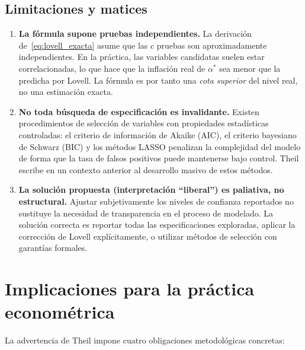 \documentclass[12pt, letterpaper]{article}
\begin{document}
\subsection{Limitaciones y matices}

\begin{enumerate}[leftmargin=1.8cm, label=\textbf{\arabic*.}]

  \item \textbf{La fórmula supone pruebas independientes.}
    La derivación de~\eqref{eq:lovell_exacta} asume que las $c$ pruebas
    son aproximadamente independientes. En la práctica, las variables
    candidatas suelen estar correlacionadas, lo que hace que la inflación
    real de $\alpha^*$ sea menor que la predicha por Lovell. La fórmula
    es por tanto una \emph{cota superior} del nivel real, no una estimación
    exacta.

  \item \textbf{No toda búsqueda de especificación es invalidante.}
    Existen procedimientos de selección de variables con propiedades
    estadísticas controladas: el criterio de información de Akaike (AIC),
    el criterio bayesiano de Schwarz (BIC) y los métodos LASSO penalizan
    la complejidad del modelo de forma que la tasa de falsos positivos
    puede mantenerse bajo control. Theil escribe en un contexto anterior
    al desarrollo masivo de estos métodos.

  \item \textbf{La solución propuesta (interpretación ``liberal'') es
    paliativa, no estructural.} Ajustar subjetivamente los niveles de
    confianza reportados no sustituye la necesidad de transparencia en
    el proceso de modelado. La solución correcta es reportar todas las
    especificaciones exploradas, aplicar la corrección de Lovell
    explícitamente, o utilizar métodos de selección con garantías formales.

\end{enumerate}

\section{Implicaciones para la práctica econométrica}

La advertencia de Theil impone cuatro obligaciones metodológicas concretas:
\end{document}
